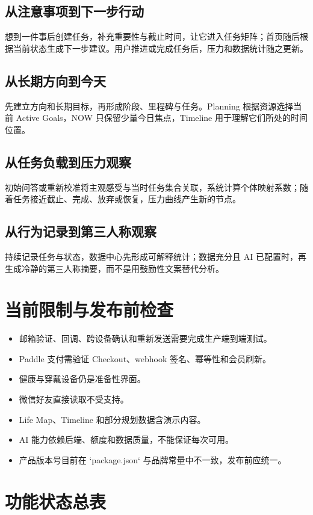 \documentclass[11pt,a4paper,openany]{ctexrep}
\begin{document}
\section{从注意事项到下一步行动}
想到一件事后创建任务，补充重要性与截止时间，让它进入任务矩阵；首页随后根据当前状态生成下一步建议。用户推进或完成任务后，压力和数据统计随之更新。

\section{从长期方向到今天}
先建立方向和长期目标，再形成阶段、里程碑与任务。Planning 根据资源选择当前 Active Goals，NOW 只保留少量今日焦点，Timeline 用于理解它们所处的时间位置。

\section{从任务负载到压力观察}
初始问答或重新校准将主观感受与当时任务集合关联，系统计算个体映射系数；随着任务接近截止、完成、放弃或恢复，压力曲线产生新的节点。

\section{从行为记录到第三人称观察}
持续记录任务与状态，数据中心先形成可解释统计；数据充分且 AI 已配置时，再生成冷静的第三人称摘要，而不是用鼓励性文案替代分析。

\chapter{当前限制与发布前检查}

\begin{itemize}
  \item 邮箱验证、回调、跨设备确认和重新发送需要完成生产端到端测试。
  \item Paddle 支付需验证 Checkout、webhook 签名、幂等性和会员刷新。
  \item 健康与穿戴设备仍是准备性界面。
  \item 微信好友直接读取不受支持。
  \item Life Map、Timeline 和部分规划数据含演示内容。
  \item AI 能力依赖后端、额度和数据质量，不能保证每次可用。
  \item 产品版本号目前在 `package.json` 与品牌常量中不一致，发布前应统一。
\end{itemize}

\chapter{功能状态总表}
\end{document}
